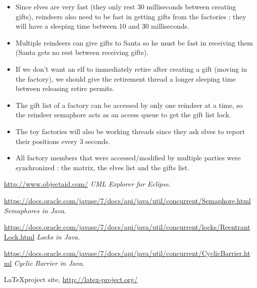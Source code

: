 \documentclass{article}
\begin{document}
\begin{itemize}
    \item Since elves are very fast (they only rest 30 milliseconds between creating gifts), reindeers also need to be fast in getting gifts from the factories :
    they will have a sleeping time between 10 and 30 milliseconds.
    \item Multiple reindeers can give gifts to Santa so he must be fast in receiving them (Santa gets no rest between receiving gifts).
    \item If we don't want an elf to immediately retire after creating a gift (moving in the factory), we should give the retirement thread a longer sleeping time between releasing retire permits.
    \item The gift list of a factory can be accessed by only one reindeer at a time, so the reindeer semaphore acts as an access queue to get the gift list lock.
    \item The toy factories will also be working threads since they ask elves to report their positions every 3 seconds.
    \item All factory members that were accessed/modified by multiple parties were synchronized : the matrix, the elves list and the gifts list.
    
\end{itemize}
\vfill
\begin{thebibliography}{9}
\label{sec_ref}

\url{http://www.objectaid.com/}
 \emph {UML Explorer for Eclipse}.
 
\url{https://docs.oracle.com/javase/7/docs/api/java/util/concurrent/Semaphore.html}
 \emph {Semaphores in Java}.
 
\url{https://docs.oracle.com/javase/7/docs/api/java/util/concurrent/locks/ReentrantLock.html}
 \emph {Locks in Java}.
 
\url{https://docs.oracle.com/javase/7/docs/api/java/util/concurrent/CyclicBarrier.html}
 \emph {Cyclic Barrier in Java}.
 
\LaTeX project site,
\url{http://latex-project.org/}

\end{thebibliography}

 

\vfill
\end{document}
